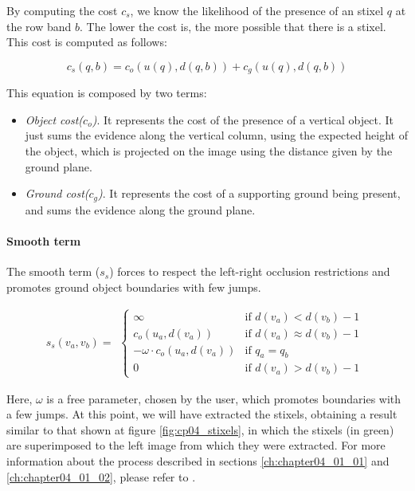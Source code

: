 By computing the cost $c_s$, we know the likelihood of the presence of an stixel $q$ at the row band $b$. The lower the cost is, the more possible that there is a stixel. This cost is computed as follows:

\begin{equation}\label{eq:cp04_stixel_band_cost_data_term}
  c_s(q, b) = c_o (u(q), d(q, b)) + c_g(u(q), d(q,b))
\end{equation}

This equation is composed by two terms:
\begin{itemize}
 \item \emph{Object cost($c_o$)}. It represents the cost of the presence of a vertical object. It just sums the evidence along the vertical column, using the expected height of the object, which is projected on the image using the distance given by the ground plane.
 \item \emph{Ground cost($c_g$)}. It represents the cost of a supporting ground being present, and sums the evidence along the ground plane.
\end{itemize}

\paragraph{Smooth term}\label{ch:chapter04_01_02_02}

The smooth term ($s_s$) forces to respect the left-right occlusion restrictions and promotes ground object boundaries with few jumps.

\begin{equation}\label{eq:cp04_stixel_band_cost_smooth_term}
  s_s(v_a, v_b) = 
  \begin{align*}
    \begin{cases}
    \infty & \text{if } d(v_a) < d(v_b) - 1 \\
    c_o(u_a, d(v_a)) & \text{if } d(v_a) \approx d(v_b) - 1 \\
    - \omega \cdot c_o(u_a, d(v_a)) & \text{if } q_a = q_b \\
    0 & \text{if } d(v_a) > d(v_b) - 1
    \end{cases}
  \end{align*}
\end{equation}

Here, $\omega$ is a free parameter, chosen by the user, which promotes boundaries with a few jumps. At this point, we will have extracted the stixels, obtaining a result similar to that shown at figure \ref{fig:cp04_stixels}, in which the stixels (in green) are superimposed to the left image from which they were extracted. For more information about the process described in sections \ref{ch:chapter04_01_01} and \ref{ch:chapter04_01_02}, please refer to \cite{benenson2012fast}.

